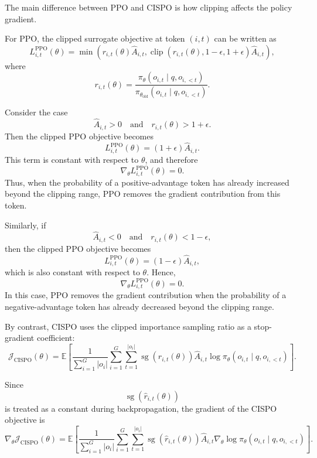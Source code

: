 The main difference between PPO and CISPO is how clipping affects the policy gradient.

For PPO, the clipped surrogate objective at token $(i,t)$ can be written as
\[
    L^{\mathrm{PPO}}_{i,t}(\theta)
    =
    \min
    \left(
        r_{i,t}(\theta)\hat A_{i,t},
        \operatorname{clip}
        \left(
            r_{i,t}(\theta),
            1-\epsilon,
            1+\epsilon
        \right)
        \hat A_{i,t}
    \right),
\]
where
\[
    r_{i,t}(\theta)
    =
    \frac{
        \pi_\theta(o_{i,t}\mid q,o_{i,<t})
    }{
        \pi_{\theta_{\mathrm{old}}}(o_{i,t}\mid q,o_{i,<t})
    }.
\]

Consider the case
\[
    \hat A_{i,t} > 0
    \quad \text{and} \quad
    r_{i,t}(\theta) > 1+\epsilon.
\]
Then the clipped PPO objective becomes
\[
    L^{\mathrm{PPO}}_{i,t}(\theta)
    =
    (1+\epsilon)\hat A_{i,t}.
\]
This term is constant with respect to $\theta$, and therefore
\[
    \nabla_\theta L^{\mathrm{PPO}}_{i,t}(\theta)
    =
    0.
\]
Thus, when the probability of a positive-advantage token has already increased beyond the clipping range, PPO removes the gradient contribution from this token.

Similarly, if
\[
    \hat A_{i,t} < 0
    \quad \text{and} \quad
    r_{i,t}(\theta) < 1-\epsilon,
\]
then the clipped PPO objective becomes
\[
    L^{\mathrm{PPO}}_{i,t}(\theta)
    =
    (1-\epsilon)\hat A_{i,t},
\]
which is also constant with respect to $\theta$. Hence,
\[
    \nabla_\theta L^{\mathrm{PPO}}_{i,t}(\theta)
    =
    0.
\]
In this case, PPO removes the gradient contribution when the probability of a negative-advantage token has already decreased beyond the clipping range.

By contrast, CISPO uses the clipped importance sampling ratio as a stop-gradient coefficient:
\[
    \mathcal{J}_{\mathrm{CISPO}}(\theta)
    =
    \mathbb{E}
    \left[
        \frac{1}{\sum_{i=1}^{G}|o_i|}
        \sum_{i=1}^{G}
        \sum_{t=1}^{|o_i|}
        \operatorname{sg}\!\left(\hat r_{i,t}(\theta)\right)
        \hat A_{i,t}
        \log \pi_\theta(o_{i,t}\mid q,o_{i,<t})
    \right].
\]

Since
\[
    \operatorname{sg}\!\left(\hat r_{i,t}(\theta)\right)
\]
is treated as a constant during backpropagation, the gradient of the CISPO objective is
\[
    \nabla_\theta \mathcal{J}_{\mathrm{CISPO}}(\theta)
    =
    \mathbb{E}
    \left[
        \frac{1}{\sum_{i=1}^{G}|o_i|}
        \sum_{i=1}^{G}
        \sum_{t=1}^{|o_i|}
        \operatorname{sg}\!\left(\hat r_{i,t}(\theta)\right)
        \hat A_{i,t}
        \nabla_\theta
        \log \pi_\theta(o_{i,t}\mid q,o_{i,<t})
    \right].
\]

